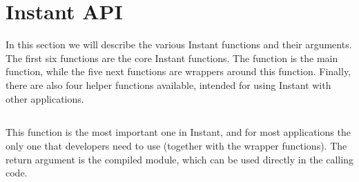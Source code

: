 
\section{Instant API}

\label{wilbers:sec:api}
In this section we will describe the various Instant functions and
their arguments. The first six functions are the core Instant
functions. The function  is the main function,
while the five next functions are wrappers around this
function. Finally, there are also four helper functions available,
intended for using Instant with other applications.

\subsection[build\_module]{}

This function is the most important one in Instant, and for most applications
the only one that developers need to use (together with the wrapper functions).
The return argument is the compiled module, which
can be used directly in the calling code.


